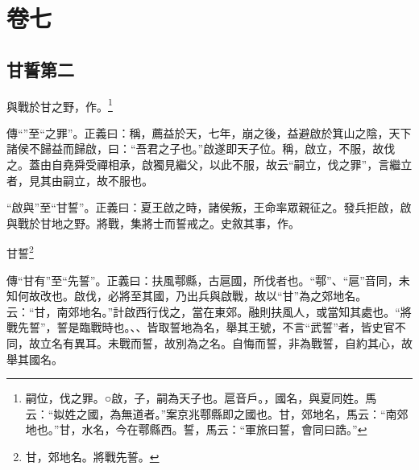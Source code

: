 

\chapter{卷七}

\section{甘誓第二}

與戰於甘之野，作。\footnote{嗣位，伐之罪。○啟，子，嗣為天子也。扈音戶。，國名，與夏同姓。馬云：“姒姓之國，為無道者。”案京兆鄠縣即之國也。甘，郊地名，馬云：“南郊地也。”甘，水名，今在鄠縣西。誓，馬云：“軍旅曰誓，會同曰誥。”}

{\noindent\zhuan{}\fzbyks 傳“”至“之罪”。正義曰：稱，薦益於天，七年，崩之後，益避啟於箕山之陰，天下諸侯不歸益而歸啟，曰：“吾君之子也。”啟遂即天子位。稱，啟立，不服，故伐之。蓋由自堯舜受禪相承，啟獨見繼父，以此不服，故云“嗣立，伐之罪”，言繼立者，見其由嗣立，故不服也。 \par}

{\noindent\shu{}\fzkt “啟與”至“甘誓”。正義曰：夏王啟之時，諸侯叛，王命率眾親征之。發兵拒啟，啟與戰於甘地之野。將戰，集將士而誓戒之。史敘其事，作。 \par}

甘誓\footnote{甘，郊地名。將戰先誓。}

{\noindent\zhuan{}\fzbyks 傳“甘有”至“先誓”。正義曰：扶風鄠縣，古扈國，所伐者也。“鄠”、“扈”音同，未知何故改也。啟伐，必將至其國，乃出兵與啟戰，故以“甘”為之郊地名。云：“甘，南郊地名。”計啟西行伐之，當在東郊。融則扶風人，或當知其處也。“將戰先誓”，誓是臨戰時也。、、皆取誓地為名，舉其王號，不言“武誓”者，皆史官不同，故立名有異耳。未戰而誓，故別為之名。自悔而誓，非為戰誓，自約其心，故舉其國名。 \par}

